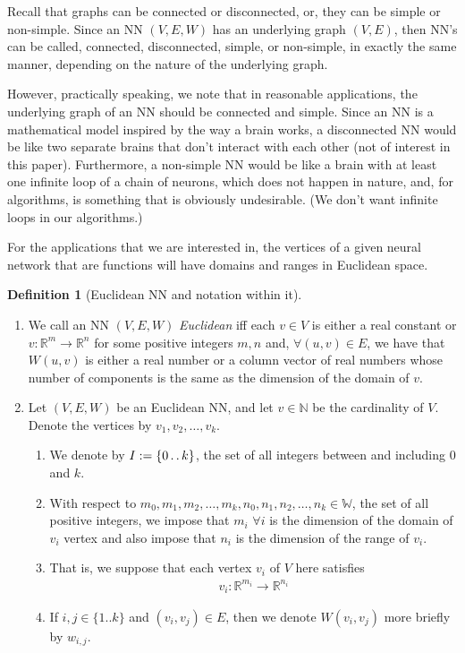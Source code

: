 \documentclass[12pt]{amsart}
\newcommand{\RR}{{\mathbb R}}
\newcommand{\twodots}{\mathinner {\ldotp \ldotp}}
\theoremstyle{definition}
\newtheorem{definition}[theorem]{Definition}
\theoremstyle{remark}
\begin{document}
Recall that graphs can be connected or disconnected, or, they can be simple or non-simple.  Since an NN $(V,E,W)$ has an underlying graph $(V,E)$, then NN's can be called, connected, disconnected, simple, or non-simple, in exactly the same manner, depending on the nature of the underlying graph.

However, practically speaking, we note that in reasonable applications, the underlying graph of an NN should be connected and simple.  Since an NN is a mathematical model inspired by the way a brain works, a disconnected NN would be like two separate brains that don't interact with each other (not of interest in this paper).  Furthermore, a non-simple NN would be like a brain with at least one infinite loop of a chain of neurons, which does not happen in nature, and, for algorithms, is something that is obviously undesirable. (We don't want infinite loops in our algorithms.)

For the applications that we are interested in, the vertices of a given neural network that are functions will have domains and ranges in Euclidean space.

\begin{definition}[Euclidean NN and notation within it]
        \begin{enumerate}
        \item We call an NN $(V,E,W)$ {\em Euclidean} iff each $v\in V$ is either a real constant or $v:\RR^m\rightarrow\RR^n$ for some positive integers $m,n$ and, $\forall (u,v)\in E$, we have that $W(u,v)$ is either a real number or a column vector of real numbers whose number of components is the same as the dimension of the domain of $v$.  
        \item Let $(V,E,W)$ be an Euclidean NN, and let $v\in\mathbb{N}$ be the cardinality of $V$.  Denote the vertices by $v_1,v_2,\ldots, v_k$.  
        \begin{enumerate}
                \item We denote by $I:=\{0\twodots k\}$, the set of all integers between and including $0$ and $k$. 
                \item With respect to $m_0,m_1, m_2, \dots, m_k, n_0, n_1, n_2, \dots, n_k \in \mathbb{W}$, the set of all positive integers, we impose that 
                $m_i$ $\forall i$ is the dimension of the domain of $v_i$ vertex and also impose that $n_i$ is the dimension of the range of $v_i$.
                \item That is, we suppose that each vertex $v_i$ of $V$ here satisfies
                \begin{align*}
                                v_i:\mathbb{R}^{m_i} \to \mathbb{R}^{n_i} 
                        \end{align*}
                \item If $i,j\in \{1..k\}$ and $(v_i,v_j)\in E$, then we denote $W(v_i,v_j)$ more briefly by $w_{i,j}$.
        \end{enumerate}
        \end{enumerate}
\end{definition}
\end{document}
